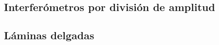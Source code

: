 \documentclass[11pt,spanish,a4paper]{article}
\begin{document}
\begin{enumerate}
%
%
%


\section*{Interferómetros por división de amplitud}

\subsection*{Láminas delgadas}
%



\end{enumerate}
\end{document}
